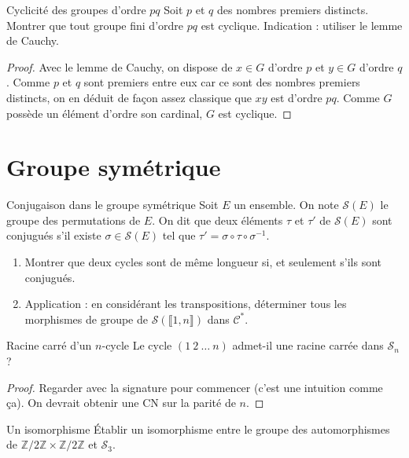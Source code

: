 \documentclass[french,a4paper]{article}
\newcommand{\Z}{\mathbb{Z}}
\newcommand{\st}{^*}
\newcommand{\inv}{^{-1}}
\theoremstyle{plain}
\theoremstyle{definition}
\theoremstyle{remark}
\begin{document}
\begin{ex}[X]{Cyclicité des groupes d'ordre $pq$}
	Soit $p$ et $q$ des nombres premiers distincts. Montrer que tout groupe fini d'ordre $pq$ est cyclique. Indication : utiliser le lemme de Cauchy.
\end{ex}

\begin{proof}
	Avec le lemme de Cauchy, on dispose de $x\in G$ d'ordre $p$ et $y\in G$ d'ordre $q$. Comme $p$ et $q$ sont premiers entre eux car ce sont des nombres premiers distincts, on en déduit de façon assez classique que $xy$ est d'ordre $pq$. Comme $G$ possède un élément d'ordre son cardinal, $G$ est cyclique.
\end{proof}

\section{Groupe symétrique}

\begin{ex}[Moulin.24]{Conjugaison dans le groupe symétrique}
	Soit $E$ un ensemble. On note $\mathcal{S}(E)$ le groupe des permutations de $E$. On dit que deux éléments $\tau$ et $\tau'$ de $\mathcal{S}(E)$ sont conjugués s'il existe $\sigma\in\mathcal{S}(E)$ tel que $\tau'=\sigma\circ\tau\circ\sigma\inv$.
	\begin{enumerate}
		\item Montrer que deux cycles sont de même longueur si, et seulement s'ils sont conjugués.
		\item Application : en considérant les transpositions, déterminer tous les morphismes de groupe de $\mathcal{S}(\llbracket1,n\rrbracket)$ dans $\mathcal{C}\st$.
	\end{enumerate}
\end{ex}

\begin{ex}[Moulin.25]{Racine carré d'un $n$-cycle}
	Le cycle $(1\ 2\ \ldots\ n)$ admet-il une racine carrée dans $\mathcal{S}_n$ ?
\end{ex}
\begin{proof}
	Regarder avec la signature pour commencer (c'est une intuition comme ça). On devrait obtenir une CN sur la parité de $n$.
\end{proof}

\begin{ex}[Moulin.26]{Un isomorphisme}
	Établir un isomorphisme entre le groupe des automorphismes de $\Z/2\Z\times\Z/2\Z$ et $\mathcal{S}_3$.
\end{ex}
\end{document}
